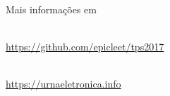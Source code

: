 \documentclass[10pt,xcolor={dvipsnames}]{beamer}
\begin{document}
\begin{frame}{Mais informações em}
  \begin{minipage}{.485\linewidth}
  \begin{center}
      \\[1em]\scriptsize\url{https://github.com/epicleet/tps2017}
  \end{center}
  \end{minipage}
  \hfill
  \begin{minipage}{.485\linewidth}
  \begin{center}
      \\[1em]\scriptsize\url{https://urnaeletronica.info}
  \end{center}
  \end{minipage}
\end{frame}
\end{document}
